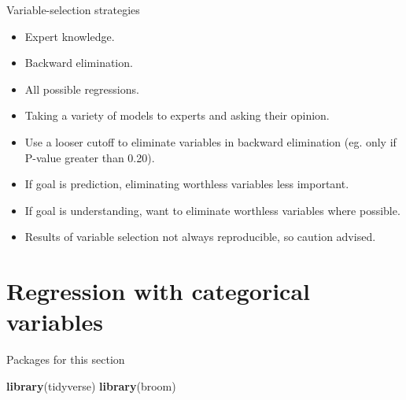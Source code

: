 \documentclass[
  ignorenonframetext,
]{beamer}
\newenvironment{Shaded}{\begin{snugshade}}{\end{snugshade}}
\newcommand{\KeywordTok}[1]{\textcolor[rgb]{0.13,0.29,0.53}{\textbf{#1}}}
\newcommand{\NormalTok}[1]{#1}
\providecommand{\tightlist}{%
  \setlength{\itemsep}{0pt}\setlength{\parskip}{0pt}}
\begin{document}
\begin{frame}{Variable-selection strategies}
\protect\hypertarget{variable-selection-strategies}{}

\begin{itemize}
\tightlist
\item
  Expert knowledge.
\item
  Backward elimination.
\item
  All possible regressions.
\item
  Taking a variety of models to experts and asking their opinion.
\item
  Use a looser cutoff to eliminate variables in backward elimination
  (eg. only if P-value greater than 0.20).
\item
  If goal is prediction, eliminating worthless variables less important.
\item
  If goal is understanding, want to eliminate worthless variables where
  possible.
\item
  Results of variable selection not always reproducible, so caution
  advised.
\end{itemize}

\end{frame}

\hypertarget{regression-with-categorical-variables}{%
\section{Regression with categorical
variables}\label{regression-with-categorical-variables}}

\begin{frame}[fragile]{Packages for this section}
\protect\hypertarget{packages-for-this-section-7}{}

\begin{Shaded}
\begin{Highlighting}[]
\KeywordTok{library}\NormalTok{(tidyverse)}
\KeywordTok{library}\NormalTok{(broom)}
\end{Highlighting}
\end{Shaded}

\end{frame}
\end{document}
